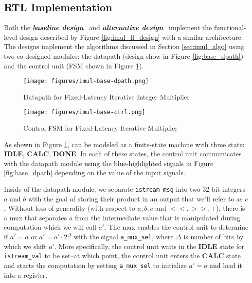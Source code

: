 \documentclass[10pt]{article}
\newcommand{\baseline}[0]{\textit{\textbf{baseline design}}}
\newcommand{\alternative}[0]{\textit{\textbf{alternative design}}}
\begin{document}
	\subsection{RTL Implementation}
	\label{sec:alt_rtl}

	Both the \baseline~ and \alternative~ implement the functional-level design described by Figure \ref{fig:imul_fl_design} with a similar architecture. The designs implement the algorithms discussed in Section \ref{sec:imul_algo} using two co-designed modules: the datapath (design show in Figure \ref{fig:base_dpath}) and the control unit (FSM shown in Figure \ref{fig:base_ctrl}).

	\begin{figure}[!ht]
		\centering
		\begin{minipage}{0.5\textwidth}
			\centering
			\texttt{[image: figures/imul-base-dpath.png]}
			\caption{Datapath for Fixed-Latency Iterative Integer Multiplier}
			\label{fig:base_dpath}
			\citep*{lab_handout}
		\end{minipage}\hfill
		\begin{minipage}{0.5\textwidth}
			\centering
			\texttt{[image: figures/imul-base-ctrl.png]} 
			\caption{Control FSM for Fixed-Latency Iterative Multiplier}
			\label{fig:base_ctrl}
			\citep*{lab_handout}
		\end{minipage}
	\end{figure}
	
	As shown in Figure \ref{fig:base_ctrl}, can be modeled as a finite-state machine with three state: \textbf{IDLE}, \textbf{CALC}, \textbf{DONE}. In each of these states, the control unit communicates with the datapath module using the blue-highlighted signals in Figure \ref{fig:base_dpath} depending on the value of the input signals.

	Inside of the datapath module, we separate \texttt{istream\_msg} into two 32-bit integers $a$ and $b$ with the goal of storing their product in an output that we'll refer to as $c$. Without loss of generality (with respect to $a,b,c$ and $<<,>>,+$), there is a mux that separates $a$ from the intermediate value that is manipulated during computation which we will call $a'$. The mux enables the control unit to determine if $a'=a$ or $a'=a'\cdot2^\Delta$ with the signal \texttt{a\_mux\_sel}, where $\Delta$ is number of bits by which we shift $a'$. More specifically, the control unit waits in the \textbf{IDLE} state for \texttt{istream\_val} to be set--at which point, the control unit enters the \textbf{CALC} state and starts the computation by setting \texttt{a\_mux\_sel} to initialize $a'=a$ and load it into a register.
	
\end{document}
